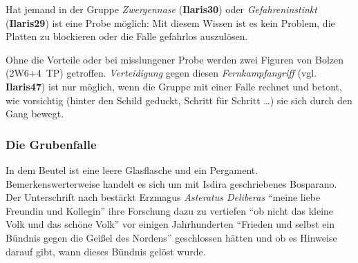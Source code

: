 \documentclass[openright]{Ilaris}
\begin{document}


Hat jemand in der Gruppe \emph{Zwergennase} (\textbf{Ilaris30}) oder \emph{Gefahreninstinkt}
(\textbf{Ilaris29}) ist eine Probe möglich:
Mit diesem Wissen ist es kein Problem, die Platten zu blockieren oder die Falle gefahrlos auszulösen.

Ohne die Vorteile oder bei misslungener Probe werden zwei Figuren von Bolzen (2W6+4~TP) getroffen. \emph{Verteidigung} gegen diesen \emph{Fernkampfangriff} (vgl. \textbf{Ilaris47}) ist nur möglich, wenn die Gruppe mit einer Falle rechnet und betont, wie vorsichtig (hinter den Schild geduckt, Schritt für Schritt \dots) sie sich durch den Gang bewegt.

\subsubsection{Die Grubenfalle}
In dem Beutel ist eine leere Glasflasche und ein Pergament. Bemerkenswerterweise handelt es sich um mit Isdira geschriebenes Bosparano. Der Unterschrift nach bestärkt Erzmagus \emph{Asteratus Deliberas} \enquote{meine liebe Freundin und Kollegin}
ihre Forschung dazu zu vertiefen \enquote{ob nicht das kleine Volk und das schöne Volk} vor einigen Jahrhunderten  \enquote{Frieden und selbst ein Bündnis gegen die Geißel des Nordens} geschlossen hätten
und ob es Hinweise darauf gibt, wann dieses Bündnis gelöst wurde.
\end{document}
